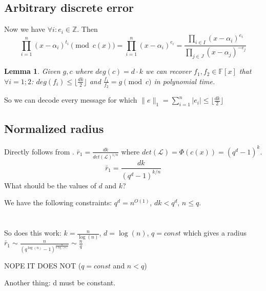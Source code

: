 \documentclass[12pt]{article}
\newcommand{\floor}[1]{\lfloor #1 \rfloor}
\newtheorem{lemma}{Lemma}
\begin{document}
\subsection{Arbitrary discrete error}
Now we have $\forall i: e_i \in \mathbb{Z}$. Then
\[
\prod_{i = 1}^{n}(x - \alpha_i)^{t_i} \pmod{c(x)} = \prod_{i = 1}^{n}(x - \alpha_i)^{e_i} = \frac{\prod_{i \in I}(x - \alpha_i)^{e_i}}{\prod_{j \in J}(x - \alpha_j)^{-e_j}}
\]
\begin{lemma}
Given $g,c$ where $deg(c) = d \cdot k$ we can recover $f_{1}, f_{2} \in \mathbb{F}[x]$ that  $\forall i = 1;2$: $deg(f_{i}) \leq \floor{\frac{dk}{2}}$ and $\frac{f_{1}}{f_{2}} = g \pmod{c}$ in polynomial time.
\end{lemma}
So we can decode every message for which $\|e\|_1 = \sum_{i =1}^{n} |e_i| \leq \floor{\frac{dk}{2}}$

\subsection{Normalized radius}
Directly follows from \cite{[DP19]}. $\bar{r}_1 = \frac{dk}{det(\mathcal{L})^{1/n}}$ where $det(\mathcal{L}) = \Phi(c(x)) = (q^{d} - 1)^{k}$.
\[
\bar{r}_1 = \frac{dk}{(q^{d} - 1)^{k/n}}
\]
What should be the values of $d$ and $k$?

We have the following constraints: $q^d = n^{O(1)}$, $dk < q^{d}$, $n \leq q$. \\ \\ \\
So does this work: $k = \frac{n}{\log(n)}$, $d = \log(n)$, $q = const $ which gives a radius $\bar{r}_1 \sim \frac{n}{(q^{\log(n)}-1)^{\frac{n}{n \log(n)}}} \sim \frac{n}{q}$

NOPE IT DOES NOT ($q = const$ and $n < q$)

Another thing: d must be constant.



\end{document}
